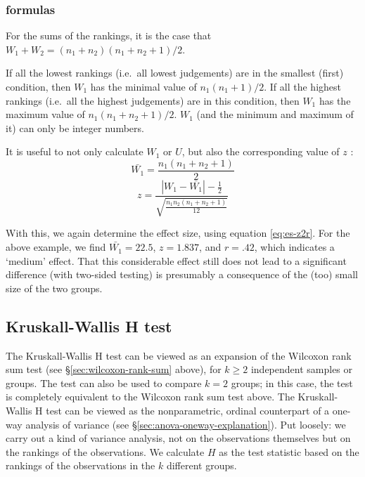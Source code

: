 \documentclass[
]{book}
\begin{document}
\hypertarget{formulas-7}{%
\subsubsection{formulas}\label{formulas-7}}

For the sums of the rankings, it is the case that
\(W_1 + W_2 = (n_1+n_2) (n_1+n_2+1) / 2\).

If all the lowest rankings (i.e.~all lowest judgements) are in the smallest (first) condition,
then \(W_1\) has the minimal value of
\(n_1 (n_1+1) /2\).
If all the highest rankings (i.e.~all the highest judgements) are in this condition,
then \(W_1\) has the maximum value of
\(n_1 (n_1+n_2+1) / 2\).
\(W_1\) (and the minimum and maximum of it) can only be integer numbers.

It is useful to not only calculate \(W_1\) or \(U\), but also the
corresponding value of \(z\) \citep{Ferg89}:
\begin{equation}
  \label{eq:Wilcoxon-ranksum}
\bar{W_1} = \frac{ n_1 (n_1+n_2+1) }{ 2 }
\end{equation}
\begin{equation}
   \label{eq:Wilcoxon-ranksum-z}
  z = \frac{ |W_1-\bar{W_1}|-\frac{1}{2} }{ \sqrt{ \frac{n_1 n_2 (n_1+n_2+1)}{12} } }
\end{equation}

With this, we again determine the effect size, using equation \eqref{eq:es-z2r}.
For the above example, we find
\(\bar{W_1}=22.5\), \(z=1.837\), and \(r=.42\), which indicates a
`medium' effect. That this considerable effect still does
not lead to a significant difference (with two-sided testing) is presumably
a consequence of the (too) small size of the two groups.

\hypertarget{kruskall-wallis-h-test}{%
\subsection{Kruskall-Wallis H test}\label{kruskall-wallis-h-test}}

The Kruskall-Wallis H test can be viewed as an expansion of the
Wilcoxon rank sum test (see
§\ref{sec:wilcoxon-rank-sum} above), for \(k \ge 2\) independent samples
or groups. The test can also be used to compare \(k=2\) groups;
in this case, the test is completely equivalent to the Wilcoxon rank sum
test above. The Kruskall-Wallis H test can be viewed as the
nonparametric, ordinal counterpart of a one-way analysis of variance
(see §\ref{sec:anova-oneway-explanation}). Put loosely: we carry out a kind of
variance analysis, not on the observations themselves but on the rankings of the
observations. We calculate \(H\) as the test statistic based on the rankings
of the observations in the \(k\) different
groups.
\end{document}
